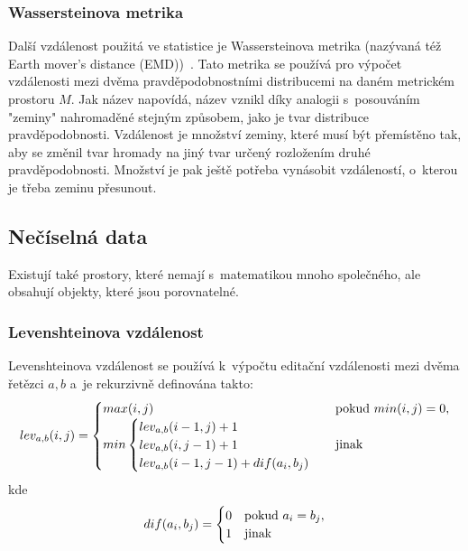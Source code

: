 \subsubsection{Wassersteinova metrika}
Další vzdálenost použitá ve statistice je Wassersteinova metrika (nazývaná též Earth mover's distance (EMD))~\cite{Vallender73}. Tato metrika se používá pro výpočet vzdá\-le\-nos\-ti mezi dvěma pravděpodobnostními distribucemi na daném metrickém prostoru $M$. Jak název napovídá, název vznikl díky analogii s~posouváním "zeminy" nahromaděné stejným způsobem, jako je tvar distribuce pravděpodobnosti. Vzdálenost je množství zeminy, které musí být přemístěno tak, aby se změnil tvar hromady na jiný tvar určený rozložením druhé pravděpodobnosti. Množství je pak ještě potřeba vynásobit vzdáleností, o~kterou je třeba zeminu přesunout.%

\subsection{Nečíselná data}
Existují také prostory, které nemají s~matematikou mnoho společného, ale obsahují objekty, které jsou porovnatelné.

\subsubsection{Levenshteinova vzdálenost} Levenshteinova vzdálenost se používá k~výpočtu editační vzdálenosti mezi dvěma řetězci $ a, b $ a~je rekurzivně definována takto:
\begin{equation}\label{eq:levenshtein}
lev_{a,b}(i,j)=
\begin{cases}
max(i,j) & $pokud $ min(i,j)=0, \cr
min \begin{cases}
lev_{a,b}(i-1,j) + 1 \cr
lev_{a,b}(i,j-1) + 1 \cr
lev_{a,b}(i-1,j-1) + dif(a_i,b_j)
\end{cases} & $jinak$
\end{cases}
\end{equation}
kde \begin{equation*}
dif(a_i,b_j)=
\begin{cases}
0 & $pokud $ a_i = b_j, \cr
1 & $jinak$
\end{cases}
\end{equation*}

